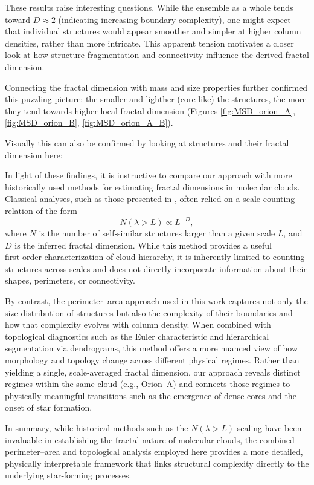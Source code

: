 These results raise interesting questions.  
While the ensemble as a whole tends toward \(D \approx 2\) (indicating increasing boundary complexity), one might expect that individual structures would appear smoother and simpler at higher column densities, rather than more intricate.  
This apparent tension motivates a closer look at how structure fragmentation and connectivity influence the derived fractal dimension.

Connecting the fractal dimension with mass and size properties further confirmed this puzzling picture: the smaller and lighther (core-like) the structures, the more they tend towards higher local fractal dimension (Figures \ref{fig:MSD_orion_A}, \ref{fig:MSD_orion_B}, \ref{fig:MSD_orion_A_B}).

Visually this can also be confirmed by looking at structures and their fractal dimension here:

In light of these findings, it is instructive to compare our approach with more historically used methods for estimating fractal dimensions in molecular clouds.  
Classical analyses, such as those presented in \cite{elmegreen1996fractal}, often relied on a scale-counting relation of the form
\[
N(\lambda > L) \propto L^{-D},
\]
where \(N\) is the number of self‑similar structures larger than a given scale \(L\), and \(D\) is the inferred fractal dimension.  
While this method provides a useful first‑order characterization of cloud hierarchy, it is inherently limited to counting structures across scales and does not directly incorporate information about their shapes, perimeters, or connectivity.

By contrast, the perimeter–area approach used in this work captures not only the size distribution of structures but also the complexity of their boundaries and how that complexity evolves with column density.  
When combined with topological diagnostics such as the Euler characteristic and hierarchical segmentation via dendrograms, this method offers a more nuanced view of how morphology and topology change across different physical regimes.  
Rather than yielding a single, scale‑averaged fractal dimension, our approach reveals distinct regimes within the same cloud (e.g., Orion~A) and connects those regimes to physically meaningful transitions such as the emergence of dense cores and the onset of star formation.

In summary, while historical methods such as the \( N(\lambda > L) \) scaling have been invaluable in establishing the fractal nature of molecular clouds, the combined perimeter–area and topological analysis employed here provides a more detailed, physically interpretable framework that links structural complexity directly to the underlying star‑forming processes.

